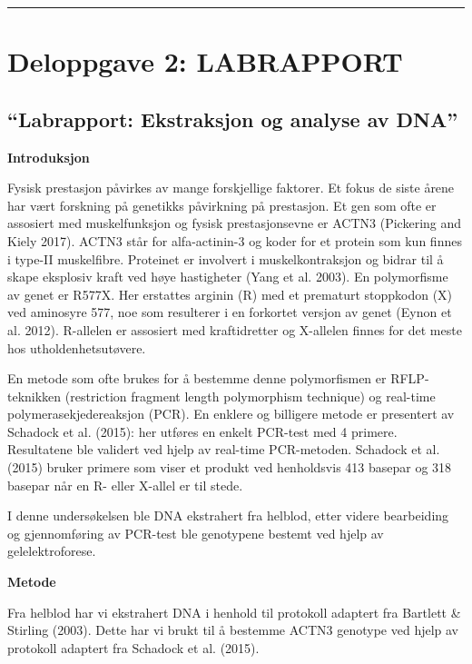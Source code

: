 \documentclass[
  letterpaper,
  DIV=11,
  numbers=noendperiod]{scrreprt}
\begin{document}
\begin{center}\rule{0.5\linewidth}{0.5pt}\end{center}


\hypertarget{deloppgave-2-labrapport}{%
\chapter{Deloppgave 2: LABRAPPORT}\label{deloppgave-2-labrapport}}

\hypertarget{labrapport-ekstraksjon-og-analyse-av-dna}{%
\section{``Labrapport: Ekstraksjon og analyse av
DNA''}\label{labrapport-ekstraksjon-og-analyse-av-dna}}

\textbf{Introduksjon}

Fysisk prestasjon påvirkes av mange forskjellige faktorer. Et fokus de
siste årene har vært forskning på genetikks påvirkning på prestasjon. Et
gen som ofte er assosiert med muskelfunksjon og fysisk prestasjonsevne
er ACTN3 (Pickering and Kiely 2017). ACTN3 står for alfa-actinin-3 og
koder for et protein som kun finnes i type-II muskelfibre. Proteinet er
involvert i muskelkontraksjon og bidrar til å skape eksplosiv kraft ved
høye hastigheter (Yang et al. 2003). En polymorfisme av genet er R577X.
Her erstattes arginin (R) med et prematurt stoppkodon (X) ved aminosyre
577, noe som resulterer i en forkortet versjon av genet (Eynon et al.
2012). R-allelen er assosiert med kraftidretter og X-allelen finnes for
det meste hos utholdenhetsutøvere.

En metode som ofte brukes for å bestemme denne polymorfismen er
RFLP-teknikken (restriction fragment length polymorphism technique) og
real-time polymerasekjedereaksjon (PCR). En enklere og billigere metode
er presentert av Schadock et al. (2015): her utføres en enkelt PCR-test
med 4 primere. Resultatene ble validert ved hjelp av real-time
PCR-metoden. Schadock et al. (2015) bruker primere som viser et produkt
ved henholdsvis 413 basepar og 318 basepar når en R- eller X-allel er
til stede.

I denne undersøkelsen ble DNA ekstrahert fra helblod, etter videre
bearbeiding og gjennomføring av PCR-test ble genotypene bestemt ved
hjelp av gelelektroforese.

\textbf{Metode}

Fra helblod har vi ekstrahert DNA i henhold til protokoll adaptert fra
Bartlett \& Stirling (2003). Dette har vi brukt til å bestemme ACTN3
genotype ved hjelp av protokoll adaptert fra Schadock et al. (2015).
\end{document}

